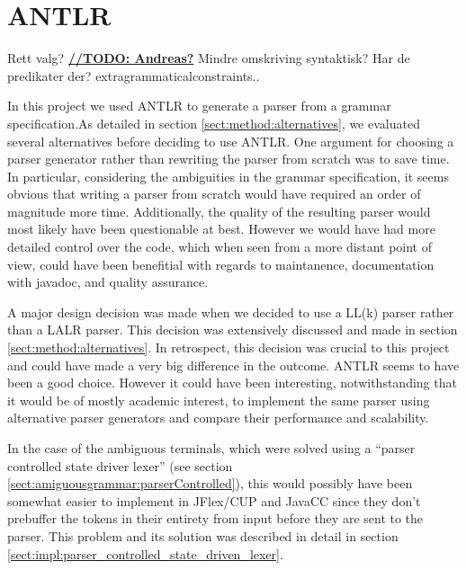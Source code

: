\section{ANTLR}
Rett valg?
\underline{\textbf{\LARGE //TODO: Andreas?}} Mindre omskriving syntaktisk? Har de predikater der? extragrammaticalconstraints..

In this project we used ANTLR to generate a parser from a grammar
specification.As detailed in section \ref{sect:method:alternatives}, we
evaluated several alternatives before deciding to use ANTLR. One argument for
choosing a parser generator rather than rewriting the parser from scratch was to
save time. In particular, considering the ambiguities in the grammar
specification, it seems obvious that writing a parser from scratch would
have required an order of magnitude more time. Additionally, the quality of the
resulting parser would most likely have been questionable at best. However
we would have had more detailed control over the code, which when seen from a
more distant point of view, could have been benefitial with regards to
maintanence, documentation with javadoc, and quality assurance.

A major design decision was made when we decided to use a LL(k) parser rather
than a LALR parser. This decision was extensively discussed and made in
section \ref{sect:method:alternatives}. In retrospect, this decision was
crucial to this project and could have made a very big difference in the
outcome. ANTLR seems to have been a good choice. However it could have been
interesting, notwithstanding that it would be of mostly academic interest, to  
implement the same parser using alternative parser generators and compare their
performance and scalability.

In the case of the ambiguous terminals, which were solved using a ``parser
controlled state driver lexer'' (see section 
\ref{sect:amiguousgrammar:parserControlled}), this would possibly have been
somewhat easier to implement in JFlex/CUP and JavaCC since they don't prebuffer 
the tokens in their entirety from input before they are sent to the parser. This
problem and its solution was described in detail in section
\ref{sect:impl:parser_controlled_state_driven_lexer}.